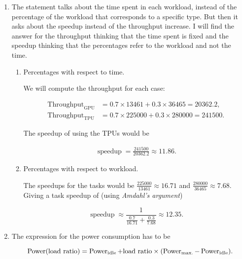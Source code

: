 \documentclass[
    12pt, %
]{fphw}
\begin{document}
\begin{enumerate}
    \item The statement talks about the time spent in each workload,
    instead of the percentage of the workload that corresponds to a specific type.
    But then it asks about the speedup instead of the throughput increase.
    I will find the answer for the throughput thinking that the time spent is fixed
    and the speedup thinking that the percentages refer to the workload and not the time.

    \begin{enumerate}
        \item Percentages with respect to time.

        We will compute the throughput for each case:

        \begin{align*}
            \operatorname{Throughput}_{\text{GPU}} &=
            0.7 \times 13461 + 0.3 \times 36465 =
            20362.2, \\
            \operatorname{Throughput}_{\text{TPU}} &=
            0.7 \times 225000 + 0.3 \times 280000 =
            241500.
        \end{align*}

        \noindent
        The speedup of using the TPUs would be

        \begin{align*}
            \operatorname{speedup} =
            \frac{241500}{20362.2} \approx
            11.86.
        \end{align*}

        \item Percentages with respect to workload.

        The speedups for the tasks would be $\frac{225000}{13461} \approx 16.71$
        and $\frac{280000}{36465} \approx 7.68$.
        Giving a task speedup of (using \textit{Amdahl's argument})

        \begin{equation*}
            \operatorname{speedup} \approx
            \frac{1}{\frac{0.7}{16.71} + \frac{0.3}{7.68}} \approx
            12.35.
        \end{equation*}
        
    \end{enumerate}

    \item The expression for the power consumption has to be

    \begin{equation*}
        \operatorname{Power}(\text{load ratio}) =
        \operatorname{Power}_{\text{idle}} + \text{load ratio} \times
            \qty(\operatorname{Power}_{\text{max.}}-\operatorname{Power}_{\text{idle}}). \\
    \end{equation*}


\end{enumerate}
\end{document}

